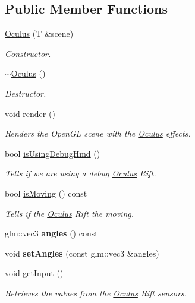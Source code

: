 \subsection*{Public Member Functions}
\begin{DoxyCompactItemize}
\item 
\hyperlink{classOculus_a4991461c1a276365ffc8ac9ea8a14451}{Oculus} (T \&scene)
\begin{DoxyCompactList}\small\item\em Constructor. \end{DoxyCompactList}\item 
\hyperlink{classOculus_a042717ce733876a9c2979576d6002107}{$\sim$\+Oculus} ()
\begin{DoxyCompactList}\small\item\em Destructor. \end{DoxyCompactList}\item 
\hypertarget{classOculus_a6c6c91e785d71aff217462ec3e7480e6}{}void \hyperlink{classOculus_a6c6c91e785d71aff217462ec3e7480e6}{render} ()\label{classOculus_a6c6c91e785d71aff217462ec3e7480e6}

\begin{DoxyCompactList}\small\item\em Renders the Open\+G\+L scene with the \hyperlink{classOculus}{Oculus} effects. \end{DoxyCompactList}\item 
bool \hyperlink{classOculus_a35064b5bb6690b448069cb5f632cb29a}{is\+Using\+Debug\+Hmd} ()
\begin{DoxyCompactList}\small\item\em Tells if we are using a debug \hyperlink{classOculus}{Oculus} Rift. \end{DoxyCompactList}\item 
bool \hyperlink{classOculus_a78996f68a93fce8d5b01f6915e1072f2}{is\+Moving} () const 
\begin{DoxyCompactList}\small\item\em Tells if the \hyperlink{classOculus}{Oculus} Rift the moving. \end{DoxyCompactList}\item 
\hypertarget{classOculus_adf5026a36325cfa4e4d2994238586574}{}glm\+::vec3 {\bfseries angles} () const \label{classOculus_adf5026a36325cfa4e4d2994238586574}

\item 
\hypertarget{classOculus_a829fa3c712d6367a5f662942f73adc21}{}void {\bfseries set\+Angles} (const glm\+::vec3 \&angles)\label{classOculus_a829fa3c712d6367a5f662942f73adc21}

\item 
void \hyperlink{classOculus_a60f6bd046dfba11f0d9f3e7277b4a0bb}{get\+Input} ()
\begin{DoxyCompactList}\small\item\em Retrieves the values from the \hyperlink{classOculus}{Oculus} Rift sensors. \end{DoxyCompactList}\end{DoxyCompactItemize}
